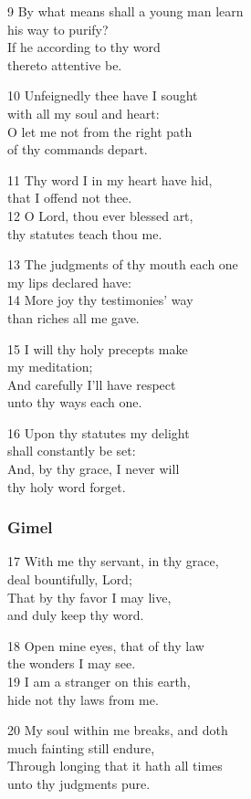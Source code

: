 \begin{multicols}{3}
9 By what means shall a young man learn\\
his way to purify?\\
If he according to thy word\\
thereto attentive be.

10 Unfeignedly thee have I sought\\
with all my soul and heart:\\
O let me not from the right path\\
of thy commands depart.

11 Thy word I in my heart have hid,\\
that I offend not thee.\\
12 O Lord, thou ever blessed art,\\
thy statutes teach thou me.

13 The judgments of thy mouth each one\\
my lips declared have:\\
14 More joy thy testimonies' way\\
than riches all me gave.

15 I will thy holy precepts make\\
my meditation;\\
And carefully I’ll have respect\\
unto thy ways each one.

16 Upon thy statutes my delight\\
shall constantly be set:\\
And, by thy grace, I never will\\
thy holy word forget.

\subsubsection*{Gimel}

17 With me thy servant, in thy grace,\\
deal bountifully, Lord;\\
That by thy favor I may live,\\
and duly keep thy word.

18 Open mine eyes, that of thy law\\
the wonders I may see.\\
19 I am a stranger on this earth,\\
hide not thy laws from me.

20 My soul within me breaks, and doth\\
much fainting still endure,\\
Through longing that it hath all times\\
unto thy judgments pure.


\end{multicols}
